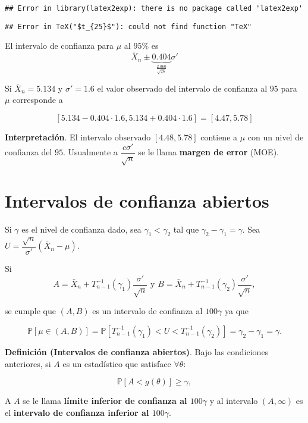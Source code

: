 \documentclass[
  12pt,
]{book}
\begin{document}
\begin{verbatim}
## Error in library(latex2exp): there is no package called 'latex2exp'
\end{verbatim}

\begin{verbatim}
## Error in TeX("$t_{25}$"): could not find function "TeX"
\end{verbatim}

El intervalo de confianza para \(\mu\) al \(95\%\) es \[\bar X_n \pm \underbrace{0.404}_{\frac{2.060}{\sqrt{26}}}\sigma'\]

Si \(\bar X_n = 5.134\) y \(\sigma' = 1.6\) el valor observado del intervalo de confianza al \(95%
\) para \(\mu\) corresponde a

\[[5.134-0.404\cdot1.6, 5.134+0.404\cdot1.6]= [4.47,5.78]\]

\textbf{Interpretación}. El intervalo observado \([4.48,5.78]\) contiene a \(\mu\) con un nivel de confianza del \(95%
\).
Usualmente a \(\dfrac{c\sigma'}{\sqrt{n}}\) se le llama \textbf{margen de error} (MOE).

\hypertarget{intervalos-de-confianza-abiertos}{%
\section{Intervalos de confianza abiertos}\label{intervalos-de-confianza-abiertos}}

Si \(\gamma\) es el nivel de confianza dado, sea \(\gamma_1<\gamma_2\) tal que \(\gamma_2 -\gamma_1 = \gamma\). Sea \(U = \dfrac{\sqrt n}{\sigma'}(\bar X_n-\mu)\).

Si
\[A= \bar X_n + T_{n-1}^{-1}(\gamma_1)\dfrac{\sigma'}{\sqrt n} \text{ y } B= \bar X_n + T_{n-1}^{-1}(\gamma_2)\dfrac{\sigma'}{\sqrt n}, \]

se cumple que \((A,B)\) es un intervalo de confianza al \(100\gamma\) ya que

\[\mathbb P[\mu \in (A,B)] = \mathbb P[T_{n-1}^{-1}(\gamma_1)<U<T_{n-1}^{-1}(\gamma_2)] = \gamma_2-\gamma_1 = \gamma.\]

\textbf{Definición (Intervalos de confianza abiertos)}. Bajo las condiciones anteriores, si \(A\) es un estadístico que satisface \(\forall \theta\):

\[\mathbb P [A<g(\theta)]\geq \gamma,\]

A \(A\) se le llama \textbf{límite inferior de confianza al \(100\gamma\)} y al intervalo \((A,\infty)\) es el \textbf{intervalo de confianza inferior al \(100\gamma\)}.
\end{document}
